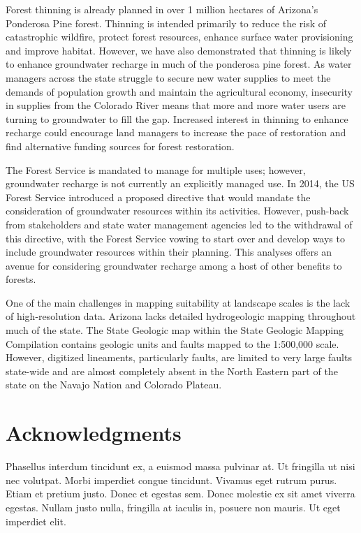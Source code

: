 \documentclass[
  number,
  preprint,
  3p,
  onecolumn]{elsarticle}
\begin{document}
Forest thinning is already planned in over 1 million hectares of
Arizona's Ponderosa Pine forest. Thinning is intended primarily to
reduce the risk of catastrophic wildfire, protect forest resources,
enhance surface water provisioning and improve habitat. However, we have
also demonstrated that thinning is likely to enhance groundwater
recharge in much of the ponderosa pine forest. As water managers across
the state struggle to secure new water supplies to meet the demands of
population growth and maintain the agricultural economy, insecurity in
supplies from the Colorado River means that more and more water users
are turning to groundwater to fill the gap. Increased interest in
thinning to enhance recharge could encourage land managers to increase
the pace of restoration and find alternative funding sources for forest
restoration.

The Forest Service is mandated to manage for multiple uses; however,
groundwater recharge is not currently an explicitly managed use. In
2014, the US Forest Service introduced a proposed directive that would
mandate the consideration of groundwater resources within its
activities. However, push-back from stakeholders and state water
management agencies led to the withdrawal of this directive, with the
Forest Service vowing to start over and develop ways to include
groundwater resources within their
planning\citep{house_agriculture_committee_2014, lexology_groundwater_directive_2014, us_forest_service_2014}.
This analyses offers an avenue for considering groundwater recharge
among a host of other benefits to forests.

One of the main challenges in mapping suitability at landscape scales is
the lack of high-resolution data. Arizona lacks detailed hydrogeologic
mapping throughout much of the state. The State Geologic map within the
State Geologic Mapping Compilation contains geologic units and faults
mapped to the 1:500,000 scale. However, digitized lineaments,
particularly faults, are limited to very large faults state-wide and are
almost completely absent in the North Eastern part of the state on the
Navajo Nation and Colorado Plateau.

\section{Acknowledgments}\label{acknowledgments}

Phasellus interdum tincidunt ex, a euismod massa pulvinar at. Ut
fringilla ut nisi nec volutpat. Morbi imperdiet congue tincidunt.
Vivamus eget rutrum purus. Etiam et pretium justo. Donec et egestas sem.
Donec molestie ex sit amet viverra egestas. Nullam justo nulla,
fringilla at iaculis in, posuere non mauris. Ut eget imperdiet elit.
\end{document}
